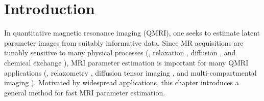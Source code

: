 
\section{Introduction}
\label{s,perk,intro}

In quantitative magnetic resonance imaging (QMRI),
one seeks to estimate latent parameter images 
from suitably informative data.
Since MR acquisitions are tunably sensitive 
to many physical processes
(\eg, relaxation \cite{bloch:1946:ni-paper}, 
diffusion \cite{torrey:56:bew},
and chemical exchange \cite{mcconnell:58:rrb}),
MRI parameter estimation is important
for many QMRI applications
(\eg, relaxometry \cite{bloembergen:1948:rei}, 
diffusion tensor imaging \cite{bihan:01:dti}, 
and multi-compartmental imaging \cite{mackay:94:ivv}). 
Motivated by widespread applications,
this chapter introduces a general method
for fast MRI parameter estimation.

